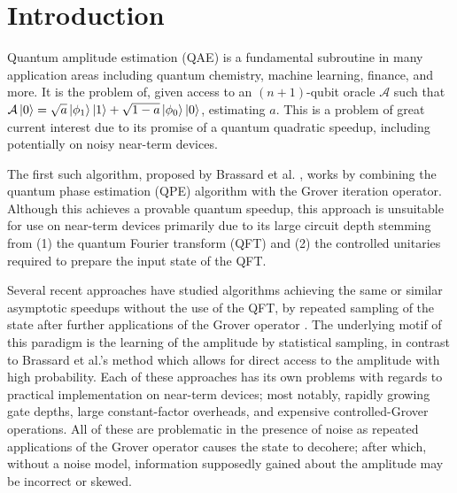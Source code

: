 
\section{Introduction}

Quantum amplitude estimation (QAE) is a fundamental subroutine in many application areas including quantum chemistry, machine learning, finance, and more. It is the problem of,\textbf{} given access to an $(n+1)$-qubit oracle $\mathcal{A}$ such that $\mathcal{A} \ket{0} = \sqrt{a} \ket{\phi_1} \ket{1} + \sqrt{1-a} \ket{\phi_0} \ket{0}$, estimating $a$. This is a problem of great current interest due to its promise of a quantum quadratic speedup, including potentially on noisy near-term devices.


The first such algorithm, proposed by Brassard et al. \cite{brassard_2002_q_amp_amp}, works by combining the quantum phase estimation (QPE) algorithm \cite{kitaev_1995_mmts_abelian_stab} with the Grover iteration operator. Although this achieves a provable quantum speedup, this approach is unsuitable for use on near-term devices primarily due to its large circuit depth stemming from (1) the quantum Fourier transform (QFT) \cite{coppersmith_2002_approximate_ft_for_q_factoring} and (2) the controlled unitaries required to prepare the input state of the QFT.

Several recent approaches have studied algorithms achieving the same or similar asymptotic speedups without the use of the QFT, by repeated sampling of the state after further applications of the Grover operator \cite{aaronson_2021_q_approx_counting, suzuki_2020_amp_without_phase, wie_2019_simpler_q_counting}. The underlying motif of this paradigm is the learning of the amplitude by statistical sampling, in contrast to Brassard et al.'s method which allows for direct access to the amplitude with high probability. Each of these approaches has its own problems with regards to practical implementation on near-term devices; most notably, rapidly growing gate depths, large constant-factor overheads, and expensive controlled-Grover operations. All of these are problematic in the presence of noise as repeated applications of the Grover operator causes the state to  decohere; after which, without a noise model, information supposedly gained about the amplitude may be incorrect or skewed.

